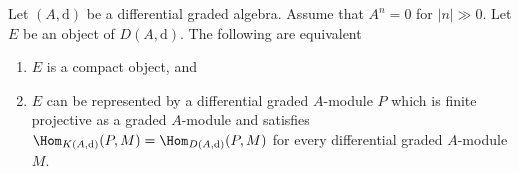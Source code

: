 %
\begin{lemma}
\label{lemma-compact}
Let $(A, \text{d})$ be a differential graded algebra. Assume that $A^n = 0$
for $|n| \gg 0$. Let $E$ be an object of $D(A, \text{d})$.
The following are equivalent
\begin{enumerate}
\item $E$ is a compact object, and
\item $E$ can be represented by a differential graded $A$-module $P$
which is finite projective as a graded $A$-module and satisfies
$\Hom_{K(A, \text{d})}(P, M) = \Hom_{D(A, \text{d})}(P, M)$
for every differential graded $A$-module $M$.
\end{enumerate}
\end{lemma}

